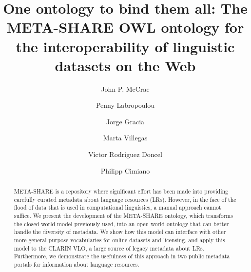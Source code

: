 \documentclass{llncs}
\begin{document}
\title{One ontology to bind them all: The META-SHARE OWL ontology for the interoperability of linguistic datasets on the Web}
%
%
\author{John P. McCrae \and Penny Labropoulou \and Jorge
Gracia \and Marta Villegas \and V\'ictor Rodr\'iguez
Doncel \and Philipp Cimiano}
%
%
%
\maketitle %
\begin{abstract}
    META-SHARE is a repository where significant effort has been made into
    providing carefully curated metadata about language resources (LRs).
    However, in the face of the flood of data that is used in computational
    linguistics, a manual approach cannot suffice. We present the development of
    the META-SHARE ontology, which transforms the closed-world model previously
    used, into an open world ontology that can better handle the diversity of
    metadata. We show how this model can interface with other more general
    purpose vocabularies for online datasets and licensing, and apply this model
    to the CLARIN VLO, a large source of legacy metadata about LRs. Furthermore,
    we demonstrate the usefulness of this approach in two public metadata
    portals for information about language resources.
\end{abstract}
\end{document}
